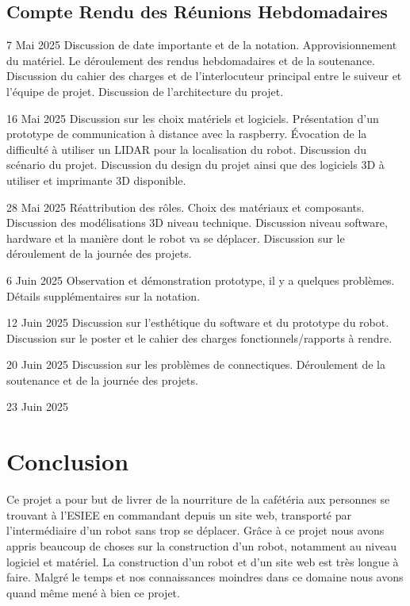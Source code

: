 \documentclass[a4paper,12pt]{report}  %
\begin{document}
\subsection{Compte Rendu des Réunions Hebdomadaires}

7 Mai 2025 
Discussion de date importante et de la notation.
Approvisionnement du matériel.
Le déroulement des rendus hebdomadaires et de la soutenance.
Discussion du cahier des charges et de l'interlocuteur principal entre le suiveur et l’équipe de projet.
Discussion de l’architecture du projet.


16 Mai 2025
Discussion sur les choix matériels et logiciels.
Présentation d'un prototype de communication à distance avec la raspberry.
Évocation de la difficulté à utiliser un LIDAR pour la localisation du robot.
Discussion du scénario du projet.
Discussion du design du projet ainsi que des logiciels 3D à utiliser et imprimante 3D disponible.


28 Mai 2025
Réattribution des rôles.
Choix des matériaux et composants.
Discussion des modélisations 3D niveau technique.
Discussion niveau software, hardware et la manière dont le robot va se déplacer.
Discussion sur le déroulement de la journée des projets.


6 Juin 2025
Observation et démonstration prototype, il y a quelques problèmes.
Détails supplémentaires sur la notation.


12 Juin 2025
Discussion sur l’esthétique du software et du prototype du robot.
Discussion sur le poster et le cahier des charges fonctionnels/rapports à rendre.


20 Juin 2025
Discussion sur les problèmes de connectiques.
Déroulement de la soutenance et de la journée des projets.


23 Juin 2025




\section{Conclusion}

Ce projet a pour but de livrer de la nourriture de la cafétéria aux personnes se trouvant à l’ESIEE en commandant depuis un site web, transporté par l’intermédiaire d’un robot sans trop se déplacer. Grâce à ce projet nous avons appris beaucoup de choses sur la construction d’un robot, notamment au niveau logiciel et matériel. La construction d’un robot et d’un site web est très longue à faire. Malgré le temps et nos connaissances moindres dans ce domaine nous avons quand même mené à bien ce projet.
\end{document}
